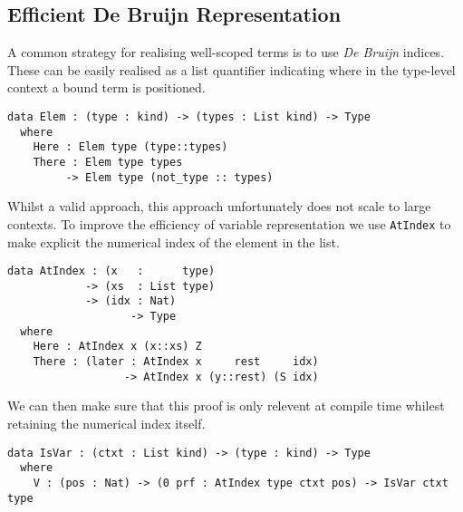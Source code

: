 \subsection{Efficient De Bruijn Representation}
\label{sec:design:deBruijn}


A common strategy for realising well-scoped terms is to use \emph{De Bruijn} indices.
These can be easily realised as a list quantifier indicating where in the type-level context a bound term is positioned.

\begin{verbatim}
data Elem : (type : kind) -> (types : List kind) -> Type
  where
    Here : Elem type (type::types)
    There : Elem type types
         -> Elem type (not_type :: types)
\end{verbatim}

\noindent
Whilst a valid approach, this approach unfortunately does not scale to large contexts.
To improve the efficiency of variable representation we use \texttt{AtIndex} to make explicit the numerical index of the element in the list.

\begin{verbatim}
data AtIndex : (x   :      type)
            -> (xs  : List type)
            -> (idx : Nat)
                   -> Type
  where
    Here : AtIndex x (x::xs) Z
    There : (later : AtIndex x     rest     idx)
                  -> AtIndex x (y::rest) (S idx)
\end{verbatim}

We can then make sure that this proof is only relevent at compile time whilest retaining the numerical index itself.

\begin{verbatim}
data IsVar : (ctxt : List kind) -> (type : kind) -> Type
  where
    V : (pos : Nat) -> (0 prf : AtIndex type ctxt pos) -> IsVar ctxt type
\end{verbatim}
